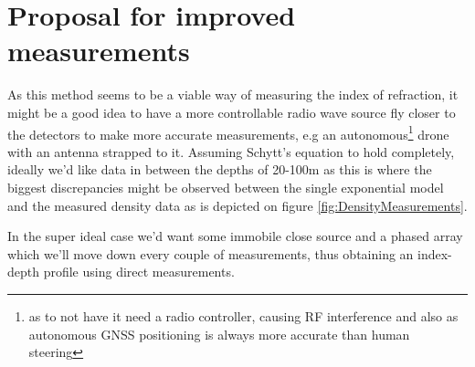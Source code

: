 \chapter*{Proposal for improved measurements}
As this method seems to be a viable way of measuring the index of refraction,
it might be a good idea to have a more controllable radio wave source fly
closer to the detectors to make more accurate measurements, e.g an
autonomous\footnote{as to not have it need a radio controller, causing RF
interference and also as autonomous GNSS positioning is always more
accurate than human steering} drone with an antenna strapped to it.  Assuming Schytt's
equation to hold completely, ideally we'd like data in between the depths of
20-100m as this is where the biggest discrepancies might be observed between
the single exponential model and the measured density data as is depicted on
figure \ref{fig:DensityMeasurements}. 

In the super ideal case we'd want some immobile close source and a phased array which we'll
move down every couple of measurements, thus obtaining an index-depth profile
using direct measurements.

